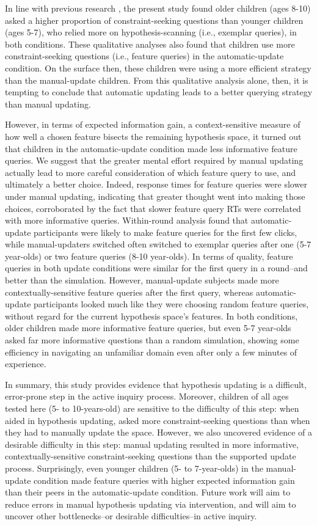 \documentclass[man,floatsintext]{apa6}
\begin{document}
In line with previous research \cite{Mosher:1966,Ruggeri:2014}, the present study found older children (ages 8-10) asked a higher proportion of constraint-seeking questions than younger children (ages 5-7), who relied more on hypothesis-scanning (i.e., exemplar queries), in both conditions. These qualitative analyses also found that children use more constraint-seeking questions (i.e., feature queries) in the automatic-update condition. On the surface then, these children were using a more efficient strategy than the manual-update children. %
From this qualitative analysis alone, then, it is tempting to conclude that automatic updating leads to a better querying strategy than manual updating.

However, in terms of expected information gain, a context-sensitive measure of how well a chosen feature bisects the remaining hypothesis space, it turned out that children in the 
automatic-update condition made less informative feature queries. We 
suggest that the greater mental effort required by manual updating actually lead 
to more careful consideration of which feature query to use, and ultimately a better choice. Indeed, response times for feature queries were slower under manual updating, indicating that greater thought went into making those choices, corroborated by the fact that slower feature query RTs were correlated with more informative queries. Within-round analysis found that automatic-update participants were likely to make feature queries for the first few clicks, while manual-updaters switched often switched to exemplar queries after one (5-7 year-olds) or two feature queries (8-10 year-olds). In terms of quality, feature queries in both update conditions were similar for the first query in a round--and better than the simulation. However, manual-update subjects made more contextually-sensitive feature queries after the first query, whereas automatic-update participants looked much like they were choosing random feature queries, without regard for the current hypothesis space's features. In both conditions, older children made more informative feature queries, but even 5-7 year-olds asked far more informative questions than a random simulation, showing some efficiency in navigating an unfamiliar domain even after only a few minutes of experience. 

In summary, this study provides evidence that hypothesis updating is a difficult, error-prone step in the active inquiry process. Moreover, children of all ages tested here (5- to 10-years-old) are sensitive to the difficulty of this step: when aided in hypothesis updating, asked more constraint-seeking questions than when they had to manually update the space. However, we also uncovered evidence of a desirable difficulty in this step: manual updating resulted in more informative, contextually-sensitive constraint-seeking questions than the supported update process. Surprisingly, even younger children (5- to 7-year-olds) in the manual-update condition made feature queries with higher expected information gain than their peers in the automatic-update condition. Future work will aim to reduce errors in manual hypothesis updating via intervention, and will aim to uncover other bottlenecks--or desirable difficulties--in active inquiry. 
\end{document}

